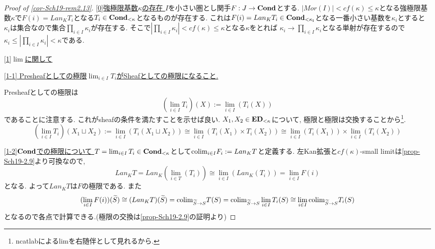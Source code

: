 \documentclass[dvipdfmx,a4paper,11pt]{article}
\newcommand{\colim}{{\rm colim}}
\theoremstyle{definition}
\begin{document}
\begin{proof}[Proof of \ref{cor-Sch19-rem2.13}]

\underline{[0]強極限基数$\kappa$の存在 }
$I$を小さい圏とし関手$F : J \to {\bf Cond}$とする.
$|Mor(I)| < cf(\kappa) \le \kappa$となる強極限基数$\kappa$で$F(i) = Lan_{K}T_i$となる$T_i \in {\bf Cond_{<\kappa}}$となるものが存在する.
これは$F(i) = Lan_{K}T_i \in {\bf Cond_{< \kappa_i}}$となる一番小さい基数を$\kappa_i$とすると
$\kappa_i$は集合なので集合$\prod_{i \in I}\kappa_i$が存在する. 
そこで$|\prod_{i \in I}\kappa_i| < cf(\kappa) \le \kappa$となる$\kappa$をとれば
$\kappa_i \to \prod_{i \in I}\kappa_i$となる単射が存在するので$\kappa_i \le |\prod_{i \in I}\kappa_i| < \kappa$である. 

\underline{ [1]$\lim$に関して }

\underline{ [1-1] Presheafとしての極限$\lim_{i \in I}T_i$がSheafとしての極限になること.}

Presheafとしての極限は
$$
(\lim_{i \in I}T_i)(X):=\lim_{i \in I}(T_{i}(X))
$$
であることに注意する. これがsheafの条件を満たすことを示せば良い.
$X_1, X_2 \in {\bf ED}_{< \kappa}$について, 極限と極限は交換することから\footnote{ncatlabによるlimを右随伴として見れるから.}.
$$
(\lim_{i \in I}T_i)(X_1 \sqcup  X_2 ) 
:= \lim_{i \in I}(T_i(X_1\sqcup X_2))
\cong 
\lim_{i \in I}(T_i(X_1)\times T_i( X_2))
\cong
\lim_{i \in I}(T_i(X_1))\times \lim_{i \in I}(T_i( X_2))
$$

 \underline{ [1-2]${\bf Cond}$での極限について }
 $T = \lim_{i \in I}T_i \in {\bf Cond}_{< \kappa}$として$\colim_{i \in I}F_i := Lan_{K}T$と定義する.
 左Kan拡張と$cf(\kappa)$-small limitは\ref{prop-Sch19-2.9}より可換なので, 
 $$
 Lan_{K}T=Lan_K(\lim_{i \in T}(T_i))\cong \lim_{i \in I}(Lan_{K}(T_i))
 =\lim_{i \in I}F(i)
 $$
 となる. よって$ Lan_{K}T$は$F$の極限である. 
  また
 $$
 (\lim_{i \in I}F(i))(\widetilde{S})
 \cong
  (Lan_{K}T)(\widetilde{S})
  =\colim_{\widetilde{S} \to S}T(S)
  =\colim_{\widetilde{S} \to S} \lim_{i \in I}T_i(S)
  \cong
   \lim_{i \in I} \colim_{\widetilde{S} \to S} T_i(S)
 $$
 となるので各点で計算できる.(極限の交換は\ref{prop-Sch19-2.9}の証明より)
 

\end{proof}
\end{document}
